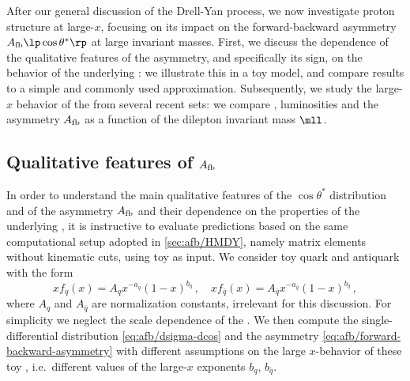 
After our general discussion of the Drell-Yan process,
we now investigate
 proton structure at large-$x$, focusing on its
impact on the forward-backward asymmetry $A_{\rm fb}\lp \cos\theta^*\rp$
at large invariant masses.
%
First, we discuss the dependence of the
qualitative features of the asymmetry,
and specifically its sign, on the behavior of the underlying \pdfs: we
illustrate this in a toy model, and compare results to a simple and 
commonly used approximation.
%
Subsequently,
we study the large-$x$ behavior of the \pdfs from several
recent \pdf sets: we compare \pdfs, luminosities and the \lo asymmetry
$A_{\rm fb}$ as a function of the dilepton invariant mass $\mll$.

\subsection{Qualitative features of \texorpdfstring{$A_{\rm fb}$}{Afb}}
\label{sec:afb/afb_toy}

In order to understand the main qualitative features of  the $\cos\theta^*$
distribution and of the asymmetry $A_{\rm fb}$ and their dependence on the 
properties of the underlying
\pdfs, it is instructive to evaluate predictions based on the
same computational setup adopted in \cref{sec:afb/HMDY}, namely
 \lo matrix elements without kinematic cuts, using toy \pdfs as input.
%
We consider toy quark and antiquark \pdf with  the form
\begin{equation}
  \label{eq:afb/toypdf}
  xf_q(x) = A_qx^{-a_q}(1-x)^{b_q} \, , \quad xf_{\bar{q}}(x) = A_{\bar{q}}x^{-a_{\bar{q}}}(1-x)^{b_{\bar{q}}} \, ,
\end{equation}
where $A_q$ and $A_{\bar{q}}$ are  normalization constants, irrelevant
for this discussion.
%
For simplicity we neglect the scale dependence of
the \pdfs.
%
We then compute the single-differential distribution \cref{eq:afb/dsigma-dcos} and
the asymmetry \cref{eq:afb/forward-backward-asymmetry} with different assumptions on the
large $x$-behavior of these toy \pdfs, i.e.\ different values of the large-$x$
exponents $b_q$, $b_{\bar{q}}$.

